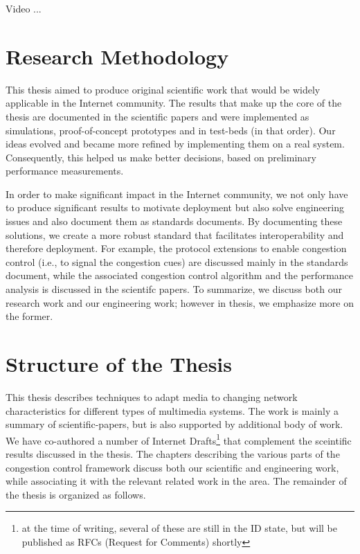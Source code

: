 Video ...


\section{Research Methodology}

This thesis aimed to produce original scientific work that would be widely
applicable in the Internet community. The results that make up the core of the
thesis are documented in the scientific papers and were implemented as
simulations, proof-of-concept prototypes and in test-beds (in that order). Our
ideas evolved and became more refined by implementing them on a real system.
Consequently, this helped us make better decisions, based on preliminary
performance measurements.

In order to make significant impact in the Internet community, we not only
have to produce significant results to motivate deployment but also solve
engineering issues and also document them as standards documents. By
documenting these solutions, we create a more robust standard that facilitates
interoperability and therefore deployment. For example, the protocol
extensions to enable congestion control (i.e., to signal the congestion cues)
are discussed mainly in the standards document, while the associated
congestion control algorithm and the performance analysis is discussed in the
scientifc papers. To summarize, we discuss both our research work and our 
engineering work; however in thesis, we emphasize more on the former.



\section{Structure of the Thesis}

This thesis describes techniques to adapt media to changing network
characteristics for different types of multimedia systems. The work is mainly
a summary of scientific-papers, but is also supported by additional body of
work. We have co-authored a number of Internet Drafts\footnote{at the time of
writing, several of these are still in the ID state, but will be published as
RFCs (Request for Comments) shortly} that complement the  sceintific results
discussed in the thesis. The chapters describing the various parts of the
congestion control framework discuss both our scientific and engineering work,
while associating it with the relevant related work in the area. The remainder
of the thesis is organized as follows.

